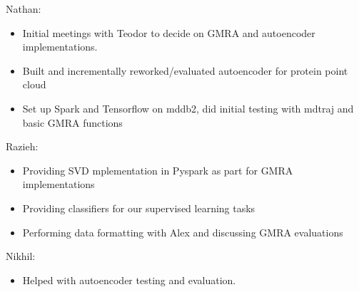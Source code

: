 \documentclass{article}
\begin{document}
Nathan:
\begin{itemize}
	\item Initial meetings with Teodor to decide on GMRA and autoencoder implementations.
	\item Built and incrementally reworked/evaluated autoencoder for protein point cloud
	\item Set up Spark and Tensorflow on mddb2, did initial testing with mdtraj and basic GMRA functions
\end{itemize}

Razieh:
\begin{itemize}
	\item Providing SVD mplementation in Pyspark as part for GMRA implementations
	\item Providing classifiers for our supervised learning tasks
	\item Performing data formatting with Alex and discussing GMRA evaluations
\end{itemize}

Nikhil:
\begin{itemize}
	\item Helped with autoencoder testing and evaluation.
\end{itemize}

\small
{}

\end{document}
